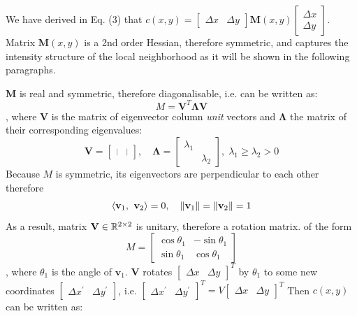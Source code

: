 \documentclass[a4paper]{article}
\begin{document}
We have derived in Eq. (3) that $c(x,y) = \begin{bmatrix}\Delta x & \Delta y \end{bmatrix} \textbf{M}(x,y) \begin{bmatrix}\Delta x \\ \Delta y \end{bmatrix}$. Matrix $\textbf{M}(x,y)$ is a 2nd order Hessian, therefore symmetric, and captures the intensity structure of the local neighborhood as it will be shown in the following paragraphs.

$\textbf{M}$ is real and symmetric, therefore diagonalisable, i.e. can be written as:
\[
M = \textbf{V}^T \boldsymbol{\Lambda} \textbf{V}
\]
, where $\textbf{V}$ is the matrix of eigenvector column \textit{unit} vectors and $\boldsymbol{\Lambda}$ the matrix of their corresponding eigenvalues:
\[
\textbf{V} = \begin{bmatrix}\overset{|}{\mathop{\underset{|}{\textbf{v}_1}}} & \overset{|}{\mathop{\underset{|}{\textbf{v}_2}}} \end{bmatrix},
\quad \boldsymbol{\Lambda} = \begin{bmatrix}\lambda_1 & \\ & \lambda_2 \end{bmatrix}, \; \lambda_1 \geq \lambda_2 > 0
\]
Because $M$ is symmetric, its eigenvectors are perpendicular to each other therefore 
\[
\left< \textbf{v}_1,\textbf{ v}_2 \right> = 0, \quad \left\lVert\textbf{v}_1\right\rVert = \left\lVert\textbf{v}_2\right\rVert = 1
\]
As a result, matrix $\textbf{V}\in \mathbb{R}^{2\times 2}$ is unitary, therefore a rotation matrix. of the form
\[
M = \begin{bmatrix}
\cos \theta_1 & -\sin\theta_1 \\
\sin\theta_1 & \cos\theta_1
\end{bmatrix}
\]
, where $\theta_1$ is the angle of $\textbf{v}_1$. $\textbf{V}$ rotates $\begin{bmatrix}\Delta x & \Delta y\end{bmatrix}^T$ by $\theta_1$ to some new coordinates $\begin{bmatrix}\Delta x^\prime & \Delta y^\prime\end{bmatrix}$, i.e. $\begin{bmatrix}\Delta x^\prime & \Delta y^\prime\end{bmatrix}^T = V \begin{bmatrix}\Delta x & \Delta y\end{bmatrix}^T$  Then $c(x,y)$ can be written as:
\end{document}
